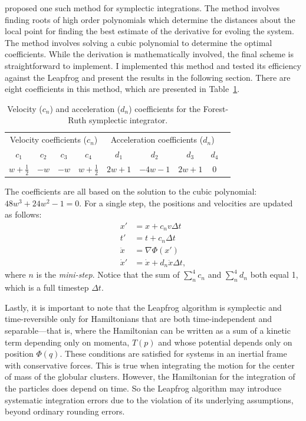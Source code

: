     \citet{1990PhyD...43..105F} proposed one such method for symplectic integrations. The method involves finding roots of high order polynomials which determine the distances about the local point for finding the best estimate of the derivative for evoling the system. The method involves solving a cubic polynomial to determine the optimal coefficients. While the derivation is mathematically involved, the final scheme is straightforward to implement. I implemented this method and tested its efficiency against the Leapfrog and present the results in the following section. There are eight coefficients in this method, which are presented in Table~\ref{tab:forest_ruth_coeffs}.
    \begin{table}[h]
        \centering
        \caption{Velocity (\(c_n\)) and acceleration (\(d_n\)) coefficients for the Forest-Ruth symplectic integrator.}
        \label{tab:forest_ruth_coeffs}
        \begin{tabular}{ccccc|cccc}
            \multicolumn{4}{c|}{Velocity coefficients (\(c_n\))} & \multicolumn{4}{c}{Acceleration coefficients (\(d_n\))} \\
            $c_1$ & $c_2$ & $c_3$ & $c_4$ & $d_1$ & $d_2$ & $d_3$ & $d_4$ \\
            \hline
            $w + \frac{1}{2}$ & $-w$ & $-w$ & $w + \frac{1}{2}$ & $2w + 1$ & $-4w - 1$ & $2w + 1$ & $0$ \\
        \end{tabular}
    \end{table} 
    The coefficients are all based on the solution to the cubic polynomial: $48 w^3 + 24 w^2 - 1 = 0 $. For a single step, the positions and velocities are updated as follows:
    \begin{align} 
        x' &= x + c_n v \Delta t \\ 
        t' &= t + c_n \Delta t \\ 
        \ddot{x} &= \nabla \Phi (x') \\ 
        \dot{x}' &= \dot{x} + d_n \ddot{x} \Delta t,
    \end{align}
    where $n$ is the \textit{mini-step}. Notice that the sum of $\sum_n^4 c_n$ and $\sum_n^4 d_n$ both equal 1, which is a full timestep $\Delta t$. 

    Lastly, it is important to note that the Leapfrog algorithm is symplectic and time-reversible only for Hamiltonians that are both time-independent and separable—that is, where the Hamiltonian can be written as a sum of a kinetic term depending only on momenta, $T(p)$ and whose potential depends only on position $\Phi(q)$. These conditions are satisfied for systems in an inertial frame with conservative forces. This is true when integrating the motion for the center of mass of the globular clusters. However, the Hamiltonian for the integration of the particles does depend on time. So the Leapfrog algorithm may introduce systematic integration errors due to the violation of its underlying assumptions, beyond ordinary rounding errors.

